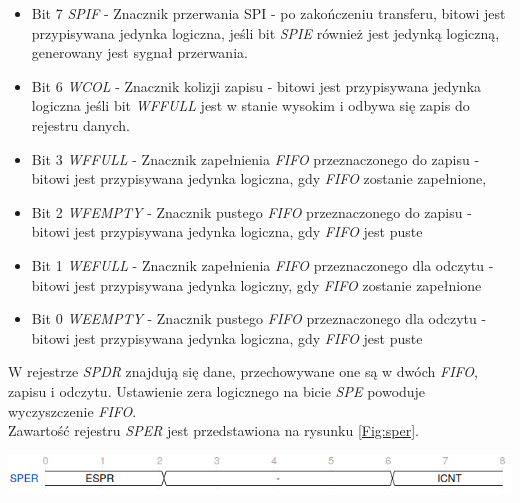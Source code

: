 \documentclass[11pt,a4paper]{article}
\begin{document}
			\begin{itemize}
				\item Bit 7 \textit{SPIF} - Znacznik przerwania SPI - po zakończeniu transferu, bitowi jest przypisywana jedynka logiczna, jeśli bit \textit{SPIE} również jest jedynką logiczną, generowany jest sygnał przerwania.
				\item Bit 6 \textit{WCOL} - Znacznik kolizji zapisu - bitowi jest przypisywana jedynka logiczna jeśli bit \textit{WFFULL} jest w stanie wysokim i odbywa się zapis do rejestru danych.
				\item Bit 3 \textit{WFFULL} - Znacznik zapełnienia \textit{FIFO} przeznaczonego do zapisu - bitowi jest przypisywana jedynka logiczna, gdy \textit{FIFO} zostanie zapełnione,
				\item Bit 2 \textit{WFEMPTY} - Znacznik pustego \textit{FIFO} przeznaczonego do zapisu - bitowi jest przypisywana jedynka logiczna, gdy \textit{FIFO} jest puste
				\item Bit 1 \textit{WEFULL} - Znacznik zapełnienia \textit{FIFO} przeznaczonego dla odczytu - bitowi jest przypisywana jedynka logiczny, gdy \textit{FIFO} zostanie zapełnione
				\item Bit 0 \textit{WEEMPTY} - Znacznik pustego \textit{FIFO} przeznaczonego dla odczytu - bitowi jest przypisywana jedynka logiczna, gdy \textit{FIFO} jest puste
			\end{itemize}
W rejestrze \textit{SPDR} znajdują się dane, przechowywane one są w dwóch \textit{FIFO}, zapisu i odczytu. Ustawienie zera logicznego na bicie \textit{SPE} powoduje wyczyszczenie \textit{FIFO}. \\
Zawartość rejestru \textit{SPER} jest przedstawiona na rysunku \ref{Fig:sper}.\\
\begin{minipage}[c]{\textwidth}
					\includegraphics[width=\textwidth]{./rysunki/sper.png}
\end{minipage}
\end{document}
